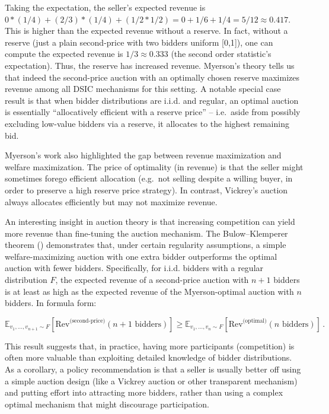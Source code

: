 \documentclass[
  letterpaper,
  numbers=noenddot,
  DIV=11]{scrreprt}
\theoremstyle{plain}
\theoremstyle{definition}
\theoremstyle{remark}
\begin{document}
Taking the expectation, the seller's expected revenue is
\(0*(1/4) + (2/3)*(1/4) + (1/2*1/2) = 0 + 1/6 + 1/4 = 5/12 \approx 0.417\).
This is higher than the expected revenue without a reserve. In fact,
without a reserve (just a plain second-price with two bidders uniform
{[}0,1{]}), one can compute the expected revenue is
\(1/3 \approx 0.333\) (the second order statistic's expectation). Thus,
the reserve has increased revenue. Myerson's theory tells us that indeed
the second-price auction with an optimally chosen reserve maximizes
revenue among all DSIC mechanisms for this setting. A notable special
case result is that when bidder distributions are i.i.d. and regular, an
optimal auction is essentially ``allocatively efficient with a reserve
price'' -- i.e.~aside from possibly excluding low-value bidders via a
reserve, it allocates to the highest remaining bid.

Myerson's work also highlighted the gap between revenue maximization and
welfare maximization. The price of optimality (in revenue) is that the
seller might sometimes forego efficient allocation (e.g.~not selling
despite a willing buyer, in order to preserve a high reserve price
strategy). In contrast, Vickrey's auction always allocates efficiently
but may not maximize revenue.

An interesting insight in auction theory is that increasing competition
can yield more revenue than fine-tuning the auction mechanism. The
Bulow--Klemperer theorem () demonstrates that, under certain regularity
assumptions, a simple welfare-maximizing auction with one extra bidder
outperforms the optimal auction with fewer bidders. Specifically, for
i.i.d. bidders with a regular distribution \(F\), the expected revenue
of a second-price auction with \(n+1\) bidders is at least as high as
the expected revenue of the Myerson-optimal auction with \(n\) bidders.
In formula form:

\[
\mathbb{E}_{v_1,\ldots,v_{n+1} \sim F}[\text{Rev}^{\text{(second-price)}}(n+1 \text{ bidders})] \geq 
\mathbb{E}_{v_1,\ldots,v_n \sim F}[\text{Rev}^{\text{(optimal)}}(n \text{ bidders})] \,. 
\tag{4.1}\label{eq-eq3.64}
\]

This result suggests that, in practice, having more participants
(competition) is often more valuable than exploiting detailed knowledge
of bidder distributions. As a corollary, a policy recommendation is that
a seller is usually better off using a simple auction design (like a
Vickrey auction or other transparent mechanism) and putting effort into
attracting more bidders, rather than using a complex optimal mechanism
that might discourage participation.
\end{document}
